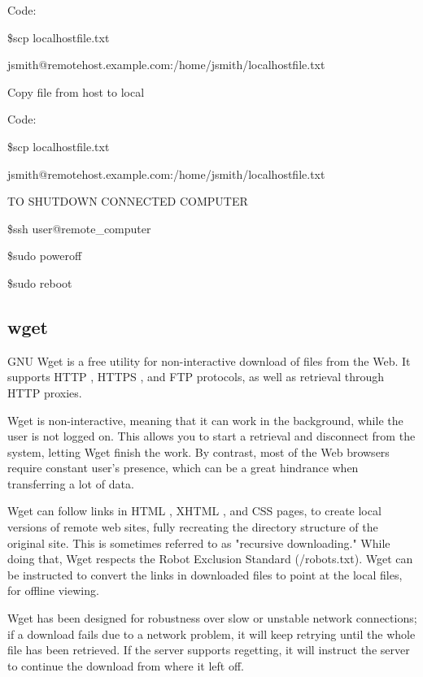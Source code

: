 \documentclass{article}
\begin{document}
\hspace{10mm}Code:

\hspace{10mm}\$scp localhostfile.txt

\hspace{10mm}jsmith@remotehost.example.com:/home/jsmith/localhostfile.txt

Copy file from host to local

\hspace{10mm}Code:

\hspace{10mm}\$scp localhostfile.txt

\hspace{10mm}jsmith@remotehost.example.com:/home/jsmith/localhostfile.txt

TO SHUTDOWN CONNECTED COMPUTER 
		
		\hspace{10mm}\$ssh user@remote\_computer
		
		\hspace{10mm}\$sudo poweroff
		
		\hspace{10mm}\$sudo reboot 


\subsection{wget}


GNU Wget is a free utility for non-interactive download of files from the Web. It supports HTTP , HTTPS , and FTP protocols, as well as retrieval through HTTP proxies.

Wget is non-interactive, meaning that it can work in the background, while the user is not logged on. This allows you to start a retrieval and disconnect from the system, letting Wget finish the work. By contrast, most of the Web browsers require constant user's presence, which can be a great hindrance when transferring a lot of data.

Wget can follow links in HTML , XHTML , and CSS pages, to create local versions of remote web sites, fully recreating the directory structure of the original site. This is sometimes referred to as "recursive downloading." While doing that, Wget respects the Robot Exclusion Standard (/robots.txt). Wget can be instructed to convert the links in downloaded files to point at the local files, for offline viewing.

Wget has been designed for robustness over slow or unstable network connections; if a download fails due to a network problem, it will keep retrying until the whole file has been retrieved. If the server supports regetting, it will instruct the server to continue the download from where it left off.
\end{document}
